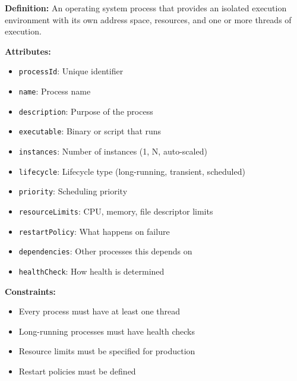 \documentclass[11pt,letterpaper]{article}
\begin{document}
\begin{definitionbox}
\textbf{Definition:} An operating system process that provides an isolated execution environment with its own address space, resources, and one or more threads of execution.

\textbf{Attributes:}
\begin{itemize}[nosep]
    \item \texttt{processId}: Unique identifier
    \item \texttt{name}: Process name
    \item \texttt{description}: Purpose of the process
    \item \texttt{executable}: Binary or script that runs
    \item \texttt{instances}: Number of instances (1, N, auto-scaled)
    \item \texttt{lifecycle}: Lifecycle type (long-running, transient, scheduled)
    \item \texttt{priority}: Scheduling priority
    \item \texttt{resourceLimits}: CPU, memory, file descriptor limits
    \item \texttt{restartPolicy}: What happens on failure
    \item \texttt{dependencies}: Other processes this depends on
    \item \texttt{healthCheck}: How health is determined
\end{itemize}

\textbf{Constraints:}
\begin{itemize}[nosep]
    \item Every process must have at least one thread
    \item Long-running processes must have health checks
    \item Resource limits must be specified for production
    \item Restart policies must be defined
\end{itemize}
\end{definitionbox}
\end{document}
